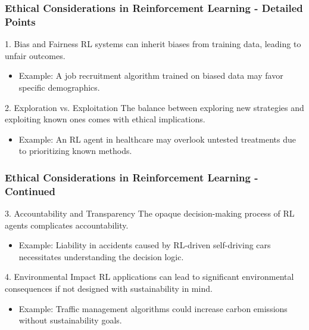 \documentclass[aspectratio=169]{beamer}
\begin{document}
\begin{frame}[fragile]
    \frametitle{Ethical Considerations in Reinforcement Learning - Detailed Points}
    \begin{block}{1. Bias and Fairness}
        RL systems can inherit biases from training data, leading to unfair outcomes.
        \begin{itemize}
            \item Example: A job recruitment algorithm trained on biased data may favor specific demographics.
        \end{itemize}
    \end{block}
    
    \begin{block}{2. Exploration vs. Exploitation}
        The balance between exploring new strategies and exploiting known ones comes with ethical implications.
        \begin{itemize}
            \item Example: An RL agent in healthcare may overlook untested treatments due to prioritizing known methods.
        \end{itemize}
    \end{block}
\end{frame}

\begin{frame}[fragile]
    \frametitle{Ethical Considerations in Reinforcement Learning - Continued}
    \begin{block}{3. Accountability and Transparency}
        The opaque decision-making process of RL agents complicates accountability.
        \begin{itemize}
            \item Example: Liability in accidents caused by RL-driven self-driving cars necessitates understanding the decision logic.
        \end{itemize}
    \end{block}

    \begin{block}{4. Environmental Impact}
        RL applications can lead to significant environmental consequences if not designed with sustainability in mind.
        \begin{itemize}
            \item Example: Traffic management algorithms could increase carbon emissions without sustainability goals.
        \end{itemize}
    \end{block}
\end{frame}
\end{document}
